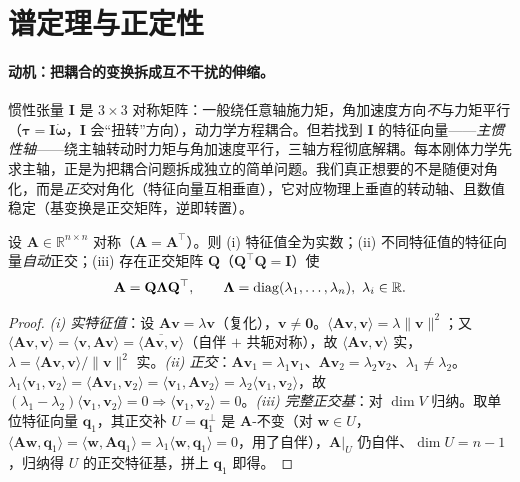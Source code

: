 \section{谱定理与正定性}
\label{sec:spectral}

\paragraph{动机：把耦合的变换拆成互不干扰的伸缩。}
惯性张量 $\mathbf{I}$ 是 $3\times3$ 对称矩阵：一般绕任意轴施力矩，角加速度方向\emph{不}与力矩平行（$\boldsymbol{\tau}=\mathbf{I}\dot{\boldsymbol{\omega}}$，$\mathbf{I}$ 会“扭转”方向），动力学方程耦合。但若找到 $\mathbf{I}$ 的特征向量——\emph{主惯性轴}——绕主轴转动时力矩与角加速度平行，三轴方程彻底解耦。每本刚体力学先求主轴，正是为把耦合问题拆成独立的简单问题。我们真正想要的不是随便对角化，而是\emph{正交}对角化（特征向量互相垂直），它对应物理上垂直的转动轴、且数值稳定（基变换是正交矩阵，逆即转置）。

\begin{theorem}[实对称谱定理]\label{thm:spectral-real}
设 $\mathbf{A}\in\mathbb{R}^{n\times n}$ 对称（$\mathbf{A}=\mathbf{A}^\top$）。则 (i) 特征值全为实数；(ii) 不同特征值的特征向量\emph{自动}正交；(iii) 存在正交矩阵 $\mathbf{Q}$（$\mathbf{Q}^\top\mathbf{Q}=\mathbf{I}$）使
\begin{equation}
  \mathbf{A}=\mathbf{Q}\boldsymbol{\Lambda}\mathbf{Q}^\top,\qquad\boldsymbol{\Lambda}=\diag(\lambda_1,\dots,\lambda_n),\ \lambda_i\in\mathbb{R}.
  \label{eq:spectral}
\end{equation}
\end{theorem}
\begin{proof}
\emph{(i) 实特征值}：设 $\mathbf{A}\mathbf{v}=\lambda\mathbf{v}$（复化），$\mathbf{v}\neq\mathbf{0}$。$\langle\mathbf{A}\mathbf{v},\mathbf{v}\rangle=\lambda\|\mathbf{v}\|^2$；又 $\langle\mathbf{A}\mathbf{v},\mathbf{v}\rangle=\langle\mathbf{v},\mathbf{A}\mathbf{v}\rangle=\overline{\langle\mathbf{A}\mathbf{v},\mathbf{v}\rangle}$（自伴 $+$ 共轭对称），故 $\langle\mathbf{A}\mathbf{v},\mathbf{v}\rangle$ 实，$\lambda=\langle\mathbf{A}\mathbf{v},\mathbf{v}\rangle/\|\mathbf{v}\|^2$ 实。\emph{(ii) 正交}：$\mathbf{A}\mathbf{v}_1=\lambda_1\mathbf{v}_1$、$\mathbf{A}\mathbf{v}_2=\lambda_2\mathbf{v}_2$、$\lambda_1\neq\lambda_2$。$\lambda_1\langle\mathbf{v}_1,\mathbf{v}_2\rangle=\langle\mathbf{A}\mathbf{v}_1,\mathbf{v}_2\rangle=\langle\mathbf{v}_1,\mathbf{A}\mathbf{v}_2\rangle=\lambda_2\langle\mathbf{v}_1,\mathbf{v}_2\rangle$，故 $(\lambda_1-\lambda_2)\langle\mathbf{v}_1,\mathbf{v}_2\rangle=0\Rightarrow\langle\mathbf{v}_1,\mathbf{v}_2\rangle=0$。\emph{(iii) 完整正交基}：对 $\dim V$ 归纳。取单位特征向量 $\mathbf{q}_1$，其正交补 $U=\mathbf{q}_1^\perp$ 是 $\mathbf{A}$-不变（对 $\mathbf{w}\in U$，$\langle\mathbf{A}\mathbf{w},\mathbf{q}_1\rangle=\langle\mathbf{w},\mathbf{A}\mathbf{q}_1\rangle=\lambda_1\langle\mathbf{w},\mathbf{q}_1\rangle=0$，用了自伴），$\mathbf{A}|_U$ 仍自伴、$\dim U=n-1$，归纳得 $U$ 的正交特征基，拼上 $\mathbf{q}_1$ 即得。
\end{proof}

